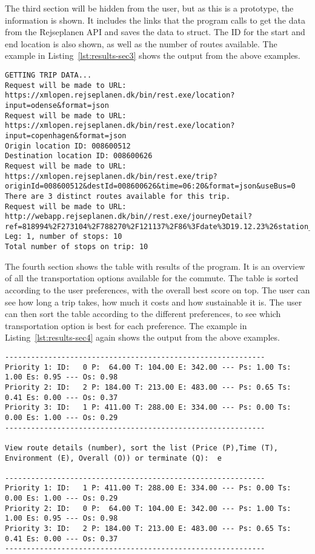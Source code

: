 The third section will be hidden from the user, but as this is a prototype, the information is shown.
It includes the links that the program calls to get the data from the Rejseplanen API and saves the data to struct.
The ID for the start and end location is also shown, as well as the number of routes available.
The example in Listing~\ref{lst:results-sec3} shows the output from the above examples.

\begin{lstlisting}[label={lst:results-sec3}, caption={Backend data output.}, captionpos=b, language={}]
GETTING TRIP DATA...
Request will be made to URL: https://xmlopen.rejseplanen.dk/bin/rest.exe/location?input=odense&format=json
Request will be made to URL: https://xmlopen.rejseplanen.dk/bin/rest.exe/location?input=copenhagen&format=json
Origin location ID: 008600512
Destination location ID: 008600626
Request will be made to URL: https://xmlopen.rejseplanen.dk/bin/rest.exe/trip?originId=008600512&destId=008600626&time=06:20&format=json&useBus=0
There are 3 distinct routes available for this trip.
Request will be made to URL: http://webapp.rejseplanen.dk/bin//rest.exe/journeyDetail?ref=818994%2F273104%2F788270%2F121137%2F86%3Fdate%3D19.12.23%26station_evaId%3D8600512%26format%3Djson
Leg: 1, number of stops: 10
Total number of stops on trip: 10
\end{lstlisting}

The fourth section shows the table with results of the program.
It is an overview of all the transportation options available for the commute.
The table is sorted according to the user preferences, with the overall best score on top.
The user can see how long a trip takes, how much it costs and how sustainable it is.
The user can then sort the table according to the different preferences, to see which transportation option is best
for each preference.
The example in Listing~\ref{lst:results-sec4} again shows the output from the above examples.

\begin{lstlisting}[label={lst:results-sec4}, caption={Routes table output.}, captionpos=b, language={}]
------------------------------------------------------------
Priority 1: ID:   0 P:  64.00 T: 104.00 E: 342.00 --- Ps: 1.00 Ts: 1.00 Es: 0.95 --- Os: 0.98
Priority 2: ID:   2 P: 184.00 T: 213.00 E: 483.00 --- Ps: 0.65 Ts: 0.41 Es: 0.00 --- Os: 0.37
Priority 3: ID:   1 P: 411.00 T: 288.00 E: 334.00 --- Ps: 0.00 Ts: 0.00 Es: 1.00 --- Os: 0.29
------------------------------------------------------------

View route details (number), sort the list (Price (P),Time (T), Environment (E), Overall (O)) or terminate (Q):  e

------------------------------------------------------------
Priority 1: ID:   1 P: 411.00 T: 288.00 E: 334.00 --- Ps: 0.00 Ts: 0.00 Es: 1.00 --- Os: 0.29
Priority 2: ID:   0 P:  64.00 T: 104.00 E: 342.00 --- Ps: 1.00 Ts: 1.00 Es: 0.95 --- Os: 0.98
Priority 3: ID:   2 P: 184.00 T: 213.00 E: 483.00 --- Ps: 0.65 Ts: 0.41 Es: 0.00 --- Os: 0.37
------------------------------------------------------------
\end{lstlisting}


